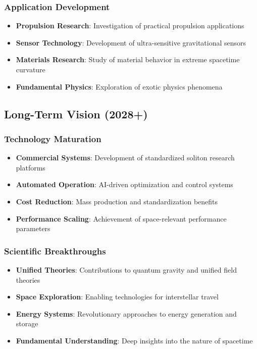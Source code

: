 \documentclass[12pt,a4paper]{article}
\begin{document}
\subsubsection{Application Development}
\begin{itemize}
\item \textbf{Propulsion Research}: Investigation of practical propulsion applications
\item \textbf{Sensor Technology}: Development of ultra-sensitive gravitational sensors
\item \textbf{Materials Research}: Study of material behavior in extreme spacetime curvature
\item \textbf{Fundamental Physics}: Exploration of exotic physics phenomena
\end{itemize}

\subsection{Long-Term Vision (2028+)}

\subsubsection{Technology Maturation}
\begin{itemize}
\item \textbf{Commercial Systems}: Development of standardized soliton research platforms
\item \textbf{Automated Operation}: AI-driven optimization and control systems
\item \textbf{Cost Reduction}: Mass production and standardization benefits
\item \textbf{Performance Scaling}: Achievement of space-relevant performance parameters
\end{itemize}

\subsubsection{Scientific Breakthroughs}
\begin{itemize}
\item \textbf{Unified Theories}: Contributions to quantum gravity and unified field theories
\item \textbf{Space Exploration}: Enabling technologies for interstellar travel
\item \textbf{Energy Systems}: Revolutionary approaches to energy generation and storage
\item \textbf{Fundamental Understanding}: Deep insights into the nature of spacetime
\end{itemize}
\end{document}
